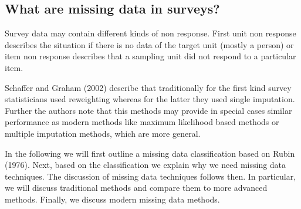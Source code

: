 \subsection{What are missing data in surveys?}

Survey data may contain different kinds of non response. First unit non response describes the situation if there is no data of the target unit (mostly a person) or item non response describes that a sampling unit did not respond to a particular item. \par

Schaffer and Graham (2002) describe that traditionally for the first kind survey statisticians used reweighting whereas for the latter they used single imputation.
Further the authors note that this methods may provide in special cases similar performance as modern methods like maximum likelihood based methods or multiple imputation methods, which are more general. \par

In the following we will first outline a missing data classification based on Rubin (1976). 
Next, based on the classification we explain why we need missing data techniques. 
The discussion of missing data techniques follows then. In particular, we will discuss traditional methods and compare them to more advanced methods. 
Finally, we discuss modern missing data methods. \par

